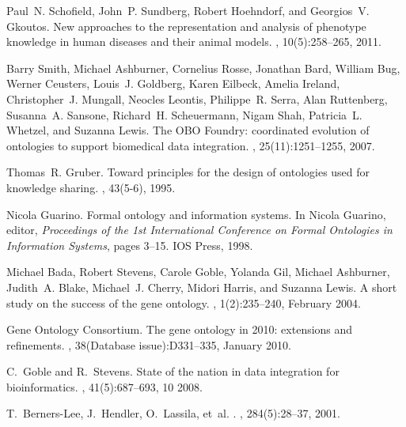 \documentclass[11pt]{article}
\begin{document}

\begin{thebibliography}{10}

Paul~N. Schofield, John~P. Sundberg, Robert Hoehndorf, and Georgios~V. Gkoutos.
\newblock New approaches to the representation and analysis of phenotype
  knowledge in human diseases and their animal models.
, 10(5):258--265, 2011.

Barry Smith, Michael Ashburner, Cornelius Rosse, Jonathan Bard, William Bug,
  Werner Ceusters, Louis~J. Goldberg, Karen Eilbeck, Amelia Ireland,
  Christopher~J. Mungall, Neocles Leontis, Philippe~R. Serra, Alan Ruttenberg,
  Susanna~A. Sansone, Richard~H. Scheuermann, Nigam Shah, Patricia~L. Whetzel,
  and Suzanna Lewis.
\newblock The {OBO} {F}oundry: coordinated evolution of ontologies to support
  biomedical data integration.
, 25(11):1251--1255, 2007.

Thomas~R. Gruber.
\newblock Toward principles for the design of ontologies used for knowledge
  sharing.
, 43(5-6), 1995.

Nicola Guarino.
\newblock Formal ontology and information systems.
\newblock In Nicola Guarino, editor, {\em Proceedings of the 1st International
  Conference on Formal Ontologies in Information Systems}, pages 3--15. IOS
  Press, 1998.

Michael Bada, Robert Stevens, Carole Goble, Yolanda Gil, Michael Ashburner,
  Judith~A. Blake, Michael~J. Cherry, Midori Harris, and Suzanna Lewis.
\newblock A short study on the success of the gene ontology.
, 1(2):235--240, February 2004.

{Gene Ontology Consortium}.
\newblock The gene ontology in 2010: extensions and refinements.
, 38(Database issue):D331--335, January
  2010.

C.~Goble and R.~Stevens.
\newblock State of the nation in data integration for bioinformatics.
, 41(5):687--693, 10 2008.

T.~Berners-Lee, J.~Hendler, O.~Lassila, et~al.
.
, 284(5):28--37, 2001.


\end{thebibliography}
\end{document}
